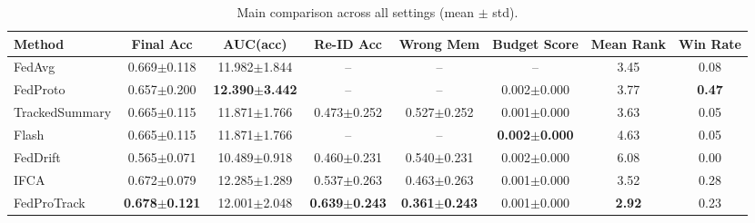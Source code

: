 \begin{table}[t]
\centering
\caption{Main comparison across all settings (mean $\pm$ std).}
\label{tab:main}
\begin{tabular}{lccccccc}
\toprule
Method & Final Acc & AUC(acc) & Re-ID Acc & Wrong Mem & Budget Score & Mean Rank & Win Rate \\
\midrule
FedAvg & 0.669$\pm$0.118 & 11.982$\pm$1.844 & -- & -- & -- & 3.45 & 0.08 \\
FedProto & 0.657$\pm$0.200 & \textbf{12.390$\pm$3.442} & -- & -- & 0.002$\pm$0.000 & 3.77 & \textbf{0.47} \\
TrackedSummary & 0.665$\pm$0.115 & 11.871$\pm$1.766 & 0.473$\pm$0.252 & 0.527$\pm$0.252 & 0.001$\pm$0.000 & 3.63 & 0.05 \\
Flash & 0.665$\pm$0.115 & 11.871$\pm$1.766 & -- & -- & \textbf{0.002$\pm$0.000} & 4.63 & 0.05 \\
FedDrift & 0.565$\pm$0.071 & 10.489$\pm$0.918 & 0.460$\pm$0.231 & 0.540$\pm$0.231 & 0.002$\pm$0.000 & 6.08 & 0.00 \\
IFCA & 0.672$\pm$0.079 & 12.285$\pm$1.289 & 0.537$\pm$0.263 & 0.463$\pm$0.263 & 0.001$\pm$0.000 & 3.52 & 0.28 \\
FedProTrack & \textbf{0.678$\pm$0.121} & 12.001$\pm$2.048 & \textbf{0.639$\pm$0.243} & \textbf{0.361$\pm$0.243} & 0.001$\pm$0.000 & \textbf{2.92} & 0.23 \\
\bottomrule
\end{tabular}
\end{table}